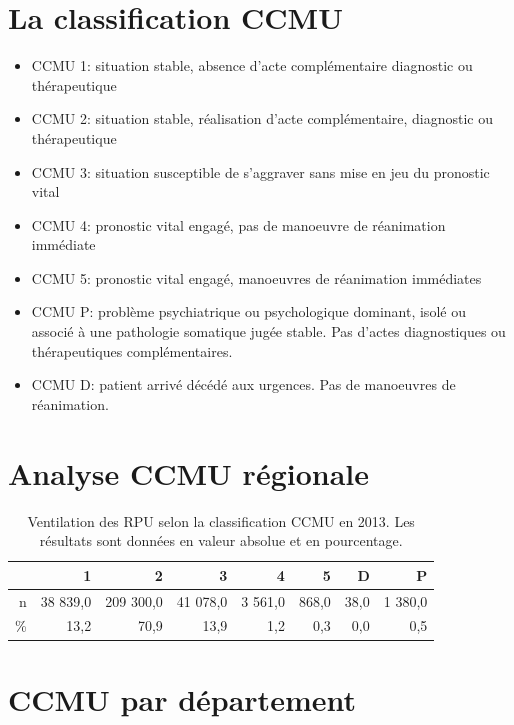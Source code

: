 \documentclass[12pt,english,french,twoside]{book}\usepackage[]{graphicx}\usepackage[]{color}
\begin{document}
\section{La classification CCMU}

\begin{itemize}
  \item CCMU 1: situation stable, absence d'acte complémentaire diagnostic ou thérapeutique
  \item CCMU 2: situation stable, réalisation d'acte complémentaire, diagnostic ou thérapeutique
  \item CCMU 3: situation susceptible de s'aggraver sans mise en jeu du pronostic vital
  \item CCMU 4: pronostic vital engagé, pas de manoeuvre de réanimation immédiate
  \item CCMU 5: pronostic vital engagé, manoeuvres de réanimation immédiates
  
  \item CCMU P: problème psychiatrique ou psychologique dominant, isolé ou associé à une pathologie somatique jugée stable. Pas d'actes diagnostiques ou thérapeutiques complémentaires.
  \item CCMU D: patient arrivé décédé aux urgences. Pas de manoeuvres de réanimation.
\end{itemize}

\section{Analyse CCMU régionale}

\begin{table}[ht]
\centering
\begin{tabular}{rrrrrrrr}
  \hline
 & 1 & 2 & 3 & 4 & 5 & D & P \\ 
  \hline
n & 38 839,0 & 209 300,0 & 41 078,0 & 3 561,0 & 868,0 & 38,0 & 1 380,0 \\ 
  \% & 13,2 & 70,9 & 13,9 & 1,2 & 0,3 & 0,0 & 0,5 \\ 
   \hline
\end{tabular}
\caption[Répartition des RPU selon la CCMU]{Ventilation des RPU selon la classification CCMU en 2013. Les résultats sont données en valeur absolue et en pourcentage.} 
\label{fig:ccmu}
\end{table}


\section{CCMU par département}
\end{document}
